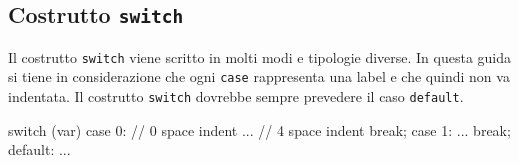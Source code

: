 \subsection{Costrutto \texttt{switch}}

Il costrutto \texttt{switch} viene scritto in molti modi e tipologie diverse.
In questa guida si tiene in considerazione che ogni \texttt{case} rappresenta una label e che quindi non va indentata.
Il costrutto \texttt{switch} dovrebbe sempre prevedere il caso \texttt{default}.

\noindent\begin{minipage}[t]{\rbwidth}
\begin{RightCode}
switch (var)
{
case 0:   // 0 space indent
    ...   // 4 space indent
    break;
case 1:
    ...
    break;
default:
    ...
}
\end{RightCode}
\end{minipage}%